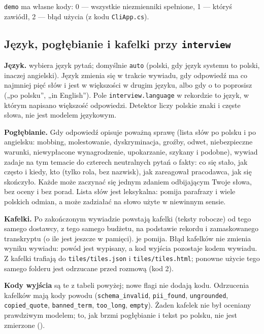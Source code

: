 {\texttt{demo} ma własne kody: 0 --- wszystkie niezmienniki spełnione, 1 ---
któryś zawiódł, 2 --- błąd użycia (z kodu \texttt{CliApp.cs}).

\subsection{Język, pogłębianie i kafelki przy \texttt{interview}}

\textbf{Język.}  wybiera język pytań; domyślnie \texttt{auto}
(polski, gdy język systemu to polski, inaczej angielski). Język zmienia się w trakcie
wywiadu, gdy odpowiedź ma co najmniej pięć słów i jest w większości w drugim języku, albo
gdy o to poprosisz („po polsku”, „in English”). Pole \texttt{interview.language} w rekordzie
to język, w którym napisano większość odpowiedzi. Detektor liczy polskie znaki i częste
słowa, nie jest modelem językowym.

\textbf{Pogłębianie.} Gdy odpowiedź opisuje poważną sprawę (lista słów po polsku i po angielsku:
mobbing, molestowanie, dyskryminacja, groźby, odwet, niebezpieczne warunki, niewypłacone
wynagrodzenie, upokarzanie, szykany i podobne), wywiad zadaje na tym temacie do czterech neutralnych pytań o fakty:
co się stało, jak często i kiedy, kto (tylko rola, bez nazwisk), jak zareagował pracodawca,
jak się skończyło. Każde może zaczynać się jednym zdaniem odbijającym Twoje słowa, bez oceny
i bez porad. Lista słów jest leksykalna: pomija parafrazy i wiele polskich odmian, a może
zadziałać na słowo użyte w niewinnym sensie.

\textbf{Kafelki.} Po zakończonym wywiadzie powstają kafelki (teksty robocze) od tego samego
dostawcy, z tego samego budżetu, na podstawie rekordu i zamaskowanego transkryptu (o ile jest
jeszcze w pamięci).  je pomija. Błąd kafelków nie zmienia wyniku wywiadu:
powód jest wypisany, a kod wyjścia pozostaje kodem wywiadu. Z  kafelki trafiają
do \texttt{tiles/tiles.json} i \texttt{tiles/tiles.html}; ponowne użycie tego samego folderu
jest odrzucane przed rozmową (kod 2).

\textbf{Kody wyjścia} są te z tabeli powyżej; nowe flagi nie dodają kodu. Odrzucenia kafelków
mają kody powodu (\texttt{schema\_invalid}, \texttt{pii\_found}, \texttt{ungrounded},
\texttt{copied\_quote}, \texttt{banned\_term}, \texttt{too\_long}, \texttt{empty}). Żaden kafelek
nie był oceniany prawdziwym modelem; to, jak brzmi pogłębianie i tekst po polsku, nie jest
zmierzone ().

}
